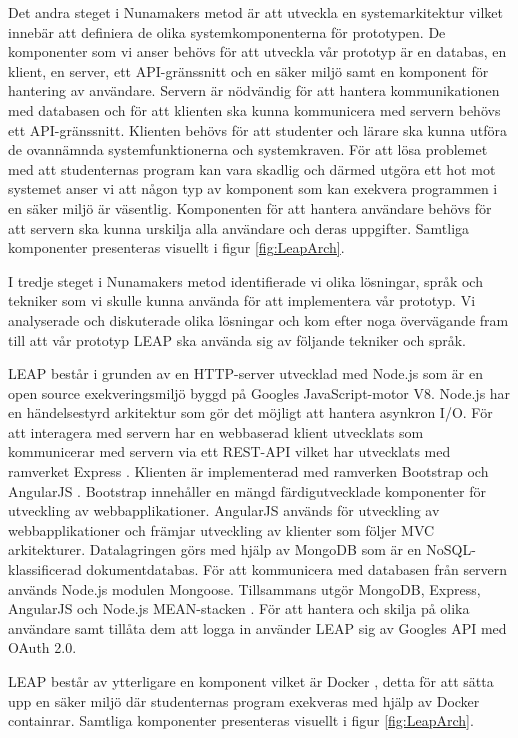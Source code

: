 \documentclass[a4paper,11pt]{article}
\begin{document}
{Det andra steget i Nunamakers metod är att utveckla en systemarkitektur vilket innebär att definiera de olika systemkomponenterna för prototypen. De komponenter som vi anser behövs för att utveckla vår prototyp är en databas,  en klient, en server, ett API-gränssnitt och en säker miljö samt en komponent för hantering av användare. Servern är nödvändig för att hantera kommunikationen med databasen och för att klienten ska kunna kommunicera med servern behövs ett API-gränssnitt. Klienten behövs för att studenter och lärare ska kunna utföra de ovannämnda systemfunktionerna och systemkraven. För att lösa problemet med att studenternas program kan vara skadlig och därmed utgöra ett hot mot systemet anser vi att någon typ av komponent som kan exekvera programmen i en säker miljö är väsentlig. Komponenten för att hantera användare behövs för att servern ska kunna urskilja alla användare och deras uppgifter. Samtliga komponenter presenteras visuellt i figur \ref{fig:LeapArch}.

I tredje steget i Nunamakers metod identifierade vi olika lösningar, språk och tekniker som vi skulle kunna använda för att implementera vår prototyp. Vi analyserade och diskuterade olika lösningar och kom efter noga övervägande fram till att vår prototyp LEAP ska använda sig av följande tekniker och språk. 

LEAP består i grunden av en HTTP-server utvecklad med Node.js \cite{nodejs} som är en open source exekveringsmiljö byggd på Googles JavaScript-motor V8. Node.js har en händelsestyrd arkitektur som gör det möjligt att hantera asynkron I/O. För att interagera med servern har en webbaserad klient utvecklats som kommunicerar med servern via ett REST-API vilket har utvecklats med ramverket Express \cite{express}. Klienten är implementerad med ramverken Bootstrap \cite{bootstrap} och AngularJS \cite{angularjs}. Bootstrap innehåller en mängd färdigutvecklade komponenter för utveckling av webbapplikationer. AngularJS används för utveckling av webbapplikationer och främjar utveckling av klienter som följer MVC arkitekturer. Datalagringen görs med hjälp av MongoDB \cite{mongodb} som är en NoSQL-klassificerad dokumentdatabas. För att kommunicera med databasen från servern används Node.js modulen Mongoose.  Tillsammans utgör MongoDB, Express, AngularJS och Node.js MEAN-stacken \cite{mean_stack}. För att hantera och skilja på olika användare samt tillåta dem att logga in använder LEAP sig av Googles API med OAuth 2.0.

LEAP består av ytterligare en komponent vilket är Docker \cite{docker}, detta för att sätta upp en säker miljö där studenternas program exekveras med hjälp av Docker containrar. Samtliga komponenter presenteras visuellt i figur \ref{fig:LeapArch}.

}
\end{document}
